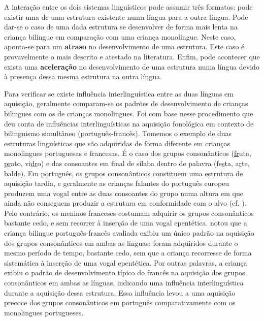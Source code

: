 \documentclass[output=paper]{LSP/langsci}
\begin{document}
A interação entre os dois sistemas linguísticos pode assumir três formatos: pode existir uma \textbf{} de uma estrutura existente numa língua para a outra língua. Pode dar-se o caso de uma dada estrutura se desenvolver de forma mais lenta na criança bilingue em comparação com uma criança monolingue. Neste caso, aponta-se para um \textbf{atraso} no desenvolvimento de uma estrutura. Este caso é provavelmente o mais descrito e atestado na literatura. Enfim, pode acontecer que exista uma \textbf{aceleração} no desenvolvimento de uma estrutura numa língua devido à presença dessa mesma estrutura na outra língua.

Para verificar se existe influência interlinguística entre as duas línguas em aquisição, geralmente comparam-se os padrões de desenvolvimento de crianças bilingues com os de crianças monolingues. Foi com base nesse procedimento que \cite{almeida2011} deu conta de influências interlinguísticas na aquisição fonológica em contexto de bilinguismo simultâneo (português-francês). Tomemos o exemplo de duas estruturas linguísticas que são adquiridas de forma diferente em crianças monolingues portuguesas e francesas. É o caso dos grupos consonânticos (\underline{fr}uta, \underline{pr}ato, vi\underline{dr}o) e das consoantes em final de sílaba dentro de palavra (fe\underline{s}ta, a\underline{r}te, ba\underline{l}de). Em português, os grupos consonânticos constituem uma estrutura de aquisição tardia, e geralmente as crianças falantes do português europeu produzem uma vogal entre as duas consoantes do grupo numa altura em que ainda não conseguem produzir a estrutura em conformidade com o alvo (cf. \citealt{freitas2017}). Pelo contrário, os meninos franceses costumam adquirir os grupos consonânticos bastante cedo, e sem recorrer à inserção de uma vogal epentética. \cite{almeida2011} notou que a criança bilingue português-francês avaliada exibiu um único padrão na aquisição dos grupos consonânticos em ambas as línguas: foram adquiridos durante o mesmo período de tempo, bastante cedo, sem que a criança recorresse de forma sistemática à inserção de uma vogal epentética. Por outras palavras, a criança exibiu o padrão de desenvolvimento típico do francês na aquisição dos grupos consonânticos em ambas as línguas, indicando uma influência interlinguística durante a aquisição dessa estrutura. Essa influência levou a uma aquisição precoce dos grupos consonânticos em português comparativamente com os monolingues portugueses. 
\end{document}
